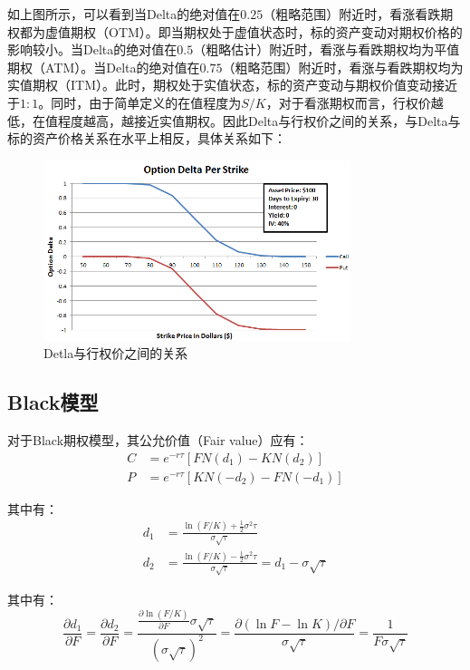 \documentclass[11pt]{article}
\begin{document}
如上图所示，可以看到当Delta的绝对值在$0.25$（粗略范围）附近时，看涨看跌期权都为虚值期权（OTM）。即当期权处于虚值状态时，标的资产变动对期权价格的影响较小。当Delta的绝对值在$0.5$（粗略估计）附近时，看涨与看跌期权均为平值期权（ATM）。当Delta的绝对值在$0.75$（粗略范围）附近时，看涨与看跌期权均为实值期权（ITM）。此时，期权处于实值状态，标的资产变动与期权价值变动接近于$1:1$。同时，由于简单定义的在值程度为$S/K$，对于看涨期权而言，行权价越低，在值程度越高，越接近实值期权。因此Delta与行权价之间的关系，与Delta与标的资产价格关系在水平上相反，具体关系如下：
\begin{figure}[H]
    \centering
    \includegraphics[width=0.8\textwidth]{fig/delta-strike.png}
    \caption{Detla与行权价之间的关系}
    \label{fig:delta-strike}
\end{figure}

\subsection{Black模型}

对于Black期权模型，其公允价值（Fair value）应有：
\begin{align*}
    C &= e^{-r\tau}\left[FN(d_1) - KN(d_2)\right] \\
    P &= e^{-r\tau}\left[KN(-d_2) - FN(-d_1)\right]
\end{align*}

其中有：
\begin{align*}
    d_1 &= \frac{\ln(F/K) + \frac{1}{2} \sigma^2 \tau}{\sigma \sqrt{\tau}} \\
    d_2 &= \frac{\ln(F/K) - \frac{1}{2} \sigma^2 \tau}{\sigma \sqrt{\tau}}
    = d_1 - \sigma \sqrt{\tau}
\end{align*}

其中有：
\begin{equation*}
    \frac{\partial d_1}{\partial F} = \frac{\partial d_2}{\partial F} = \frac{\frac{\partial \ln(F/K)}{\partial F} \sigma \sqrt{\tau}}{(\sigma \sqrt{\tau})^2} = \frac{\partial (\ln F - \ln K)/\partial F}{\sigma\sqrt{\tau}} = \frac{1}{F\sigma\sqrt{\tau}}
\end{equation*}
\end{document}
